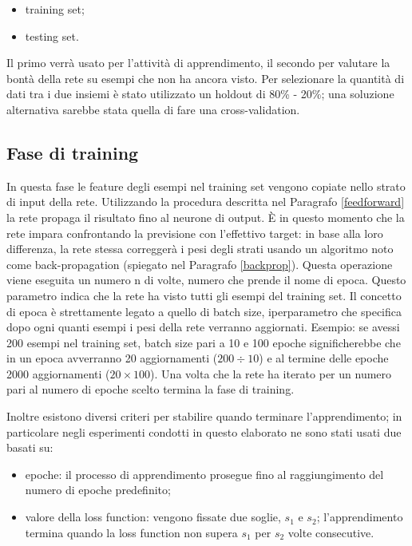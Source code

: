 \documentclass[12pt]{report}
\begin{document}
\begin{itemize}
\item{training set};
\item{testing set}.
\end{itemize}

Il primo verrà usato per l'attività di apprendimento, il secondo per valutare la bontà della rete su esempi che non ha ancora visto. Per selezionare la quantità di dati tra i due insiemi è stato utilizzato un holdout di 80\% - 20\%; una soluzione alternativa sarebbe stata quella di fare una cross-validation.

\subsection{Fase di training}
In questa fase le feature degli esempi nel training set vengono copiate nello strato di input della rete. Utilizzando la procedura descritta nel Paragrafo \ref{feedforward} la rete propaga il risultato fino al neurone di output. È in questo momento che la rete impara confrontando la previsione con l’effettivo target: in base alla loro differenza, la rete stessa correggerà i pesi degli strati usando un algoritmo noto come back-propagation (spiegato nel Paragrafo \ref{backprop}).
Questa operazione viene eseguita un numero n di volte, numero che prende il nome di epoca. Questo parametro indica che la rete ha visto tutti gli esempi del training set. Il concetto di epoca è strettamente legato a quello di batch size, iperparametro che specifica dopo ogni quanti esempi i pesi della rete verranno aggiornati.
Esempio: se avessi 200 esempi nel training set, batch size pari a 10 e 100 epoche significherebbe che in un epoca avverranno 20 aggiornamenti ($200 \div 10$) e al termine delle epoche 2000 aggiornamenti ($20 \times 100$).
Una volta che la rete ha iterato per un numero pari al numero di epoche scelto termina la fase di training.

Inoltre esistono diversi criteri per stabilire quando terminare l'apprendimento; in particolare negli esperimenti condotti in questo elaborato ne sono stati usati due basati su:
\begin{itemize}
\item{epoche}: il processo di apprendimento prosegue fino al raggiungimento del numero di epoche predefinito;
\item{valore della loss function}: vengono fissate due soglie, $s_1$ e $s_2$; l'apprendimento termina quando la loss function non supera $s_1$ per $s_2$ volte consecutive.
\end{itemize}
\end{document}
